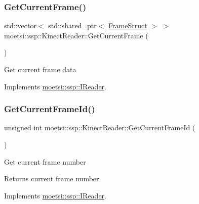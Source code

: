 \subsubsection{\texorpdfstring{Get\+Current\+Frame()}{GetCurrentFrame()}}
{\footnotesize\ttfamily std\+::vector$<$ std\+::shared\+\_\+ptr$<$ \hyperlink{structmoetsi_1_1ssp_1_1FrameStruct}{Frame\+Struct} $>$ $>$ moetsi\+::ssp\+::\+Kinect\+Reader\+::\+Get\+Current\+Frame (\begin{DoxyParamCaption}{ }\end{DoxyParamCaption})\hspace{0.3cm}{\ttfamily [virtual]}}

Get current frame data 

Implements \hyperlink{classmoetsi_1_1ssp_1_1IReader_a357439182128e3911d77335c136035c0}{moetsi\+::ssp\+::\+I\+Reader}.

\mbox{\label{classmoetsi_1_1ssp_1_1KinectReader_aa17e268723c41bdad5082575decb28eb}} 
\subsubsection{\texorpdfstring{Get\+Current\+Frame\+Id()}{GetCurrentFrameId()}}
{\footnotesize\ttfamily unsigned int moetsi\+::ssp\+::\+Kinect\+Reader\+::\+Get\+Current\+Frame\+Id (\begin{DoxyParamCaption}{ }\end{DoxyParamCaption})\hspace{0.3cm}{\ttfamily [virtual]}}

Get current frame number \begin{DoxyReturn}{Returns}
current frame number. 
\end{DoxyReturn}


Implements \hyperlink{classmoetsi_1_1ssp_1_1IReader_ac292d83eb06dee277baaa06e281a562d}{moetsi\+::ssp\+::\+I\+Reader}.

\mbox{\label{classmoetsi_1_1ssp_1_1KinectReader_ac88c13693ce8e2e249438ac8de8a7b3c}} 
